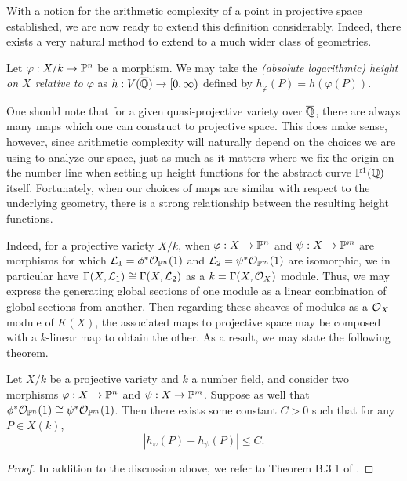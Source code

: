 With a notion for the arithmetic complexity of a point in projective space established,
we are now ready to extend this definition considerably. 
Indeed, there exists a very natural method to extend to a much wider class of geometries.

\begin{definition}
    Let $\varphi : X/k \to \mathbb{P}^n$ be a morphism.
    We may take the \textit{(absolute logarithmic) height on $X$ relative to $\varphi$} as $h : V(\overline{\mathbb{Q}}) \to [0, \infty)$ defined by $h_\varphi(P) = h(\varphi(P))$.
\end{definition}

One should note that for a given quasi-projective variety over $\overline{\mathbb{Q}}$,
there are always many maps which one can construct to projective space.
This does make sense, however,
since arithmetic complexity will naturally depend on the choices we are using to analyze our space,
just as much as it matters where we fix the origin on the number line when setting up height functions for the abstract curve $\mathbb{P}^1(\mathbb{Q})$ itself.
Fortunately, when our choices of maps are similar with respect to the underlying geometry,
there is a strong relationship between the resulting height functions.

Indeed, for a projective variety $X/k$,
when $\varphi : X \to \mathbb{P}^n$ and $\psi : X \to \mathbb{P}^m$ are morphisms for which $\mathcal{L}_1 = \phi^*\mathcal{O}_{\mathbb{P}^n}(1)$ and $\mathcal{L}_2 = \psi^*\mathcal{O}_{\mathbb{P}^m}(1)$ are isomorphic,
we in particular have $\Gamma(X, \mathcal{L}_1) \cong \Gamma(X, \mathcal{L}_2)$ as a $k = \Gamma(X, \mathcal{O}_X)$ module.
Thus, we may express the generating global sections of one module as a linear combination of global sections from another.
Then regarding these sheaves of modules as a $\mathcal{O}_X$-module of $K(X)$,
the associated maps to projective space may be composed with a $k$-linear map to obtain the other.
As a result, we may state the following theorem.

\begin{theorem}
    Let $X/k$ be a projective variety and $k$ a number field,
    and consider two morphisms $\varphi : X \to \mathbb{P}^n$ and $\psi : X \to \mathbb{P}^m$.
    Suppose as well that $\phi^*\mathcal{O}_{\mathbb{P}^n}(1) \cong \psi^*\mathcal{O}_{\mathbb{P}^m}(1)$.
    Then there exists some constant $C > 0$ such that for any $P \in X(k)$,
    \[
        |h_\varphi(P) - h_\psi(P)| \leq C.
    \]
\end{theorem}

\begin{proof}
    In addition to the discussion above,
   we refer to Theorem B.3.1 of \cite{Silverman_Hindry_2013}.
\end{proof}

